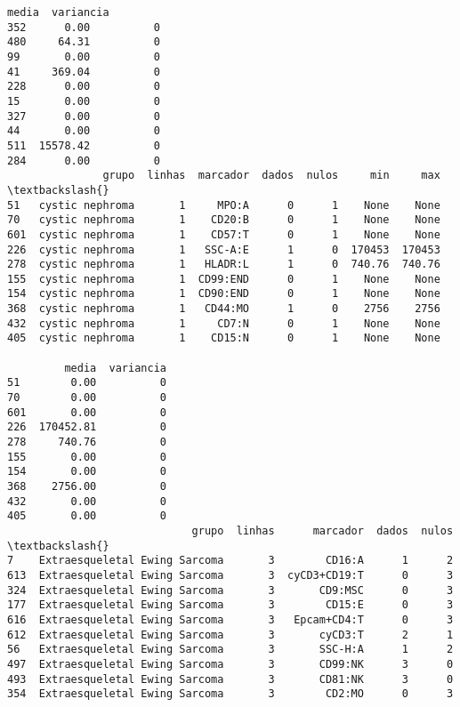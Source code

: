 \documentclass[11pt]{article}
\begin{document}
\begin{Verbatim}[commandchars=\\\{\}]
        media  variancia  
352      0.00          0  
480     64.31          0  
99       0.00          0  
41     369.04          0  
228      0.00          0  
15       0.00          0  
327      0.00          0  
44       0.00          0  
511  15578.42          0  
284      0.00          0  
               grupo  linhas  marcador  dados  nulos     min     max  \textbackslash{}
51   cystic nephroma       1     MPO:A      0      1    None    None   
70   cystic nephroma       1    CD20:B      0      1    None    None   
601  cystic nephroma       1    CD57:T      0      1    None    None   
226  cystic nephroma       1   SSC-A:E      1      0  170453  170453   
278  cystic nephroma       1   HLADR:L      1      0  740.76  740.76   
155  cystic nephroma       1  CD99:END      0      1    None    None   
154  cystic nephroma       1  CD90:END      0      1    None    None   
368  cystic nephroma       1   CD44:MO      1      0    2756    2756   
432  cystic nephroma       1     CD7:N      0      1    None    None   
405  cystic nephroma       1    CD15:N      0      1    None    None   

         media  variancia  
51        0.00          0  
70        0.00          0  
601       0.00          0  
226  170452.81          0  
278     740.76          0  
155       0.00          0  
154       0.00          0  
368    2756.00          0  
432       0.00          0  
405       0.00          0  
                             grupo  linhas      marcador  dados  nulos  \textbackslash{}
7    Extraesqueletal Ewing Sarcoma       3        CD16:A      1      2   
613  Extraesqueletal Ewing Sarcoma       3  cyCD3+CD19:T      0      3   
324  Extraesqueletal Ewing Sarcoma       3       CD9:MSC      0      3   
177  Extraesqueletal Ewing Sarcoma       3        CD15:E      0      3   
616  Extraesqueletal Ewing Sarcoma       3   Epcam+CD4:T      0      3   
612  Extraesqueletal Ewing Sarcoma       3       cyCD3:T      2      1   
56   Extraesqueletal Ewing Sarcoma       3       SSC-H:A      1      2   
497  Extraesqueletal Ewing Sarcoma       3       CD99:NK      3      0   
493  Extraesqueletal Ewing Sarcoma       3       CD81:NK      3      0   
354  Extraesqueletal Ewing Sarcoma       3        CD2:MO      0      3   


\end{Verbatim}
\end{document}
